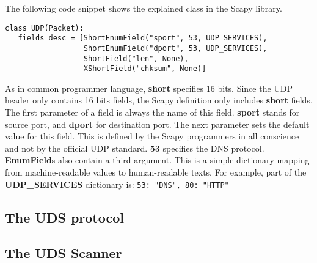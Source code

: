 The following code snippet shows the explained class in the Scapy library.

\begin{verbatim}
class UDP(Packet):
   fields_desc = [ShortEnumField("sport", 53, UDP_SERVICES),
                  ShortEnumField("dport", 53, UDP_SERVICES),
                  ShortField("len", None),
                  XShortField("chksum", None)]
\end{verbatim}

As in common programmer language, \textbf{short} specifies 16 bits. Since the UDP header only contains 16 bits fields, the Scapy definition only includes \textbf{short} fields. The first parameter of a field is always the name of this field. \textbf{sport} stands for source port, and \textbf{dport} for destination port.
The next parameter sets the default value for this field. This is defined by the Scapy programmers in all conscience and not by the official UDP standard. \textbf{53} specifies the DNS protocol.
\textbf{EnumField}s also contain a third argument. This is a simple dictionary mapping from machine-readable values to human-readable texts. For example, part of the \textbf{UDP\_SERVICES} dictionary is: \texttt{{53: "DNS", 80: "HTTP"}}





\subsection{The UDS protocol}

\subsection{The UDS Scanner}
